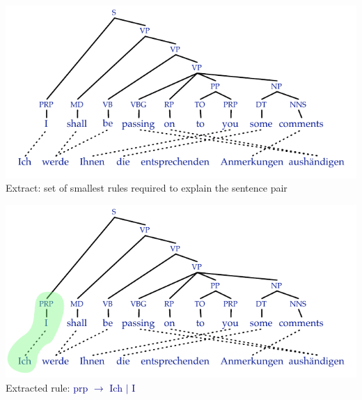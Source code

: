 \documentclass[landscape]{slides}
\newcommand{\example}[1]{\textcolor{darkblue}{\rm #1}}
\begin{document}

\vspace{5mm}
\begin{center}
\includegraphics[scale=2.1]{minimal-rules0.pdf}\\[5mm]
Extract: set of smallest rules required to explain the sentence pair
\end{center}


\vspace{5mm}
\begin{center}
\includegraphics[scale=2.1]{minimal-rules1.pdf}\\[5mm]
Extracted rule: \example{{\sc prp} $\rightarrow$ Ich $|$ I}
\end{center}

\end{document}
